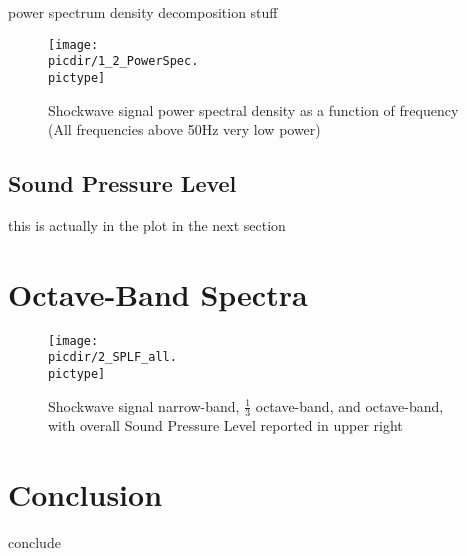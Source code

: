 \documentclass[twocolumn,10pt]{asme2ej}
\begin{document}
power spectrum density decomposition stuff

\begin{figure}[htb]
\begin{center}
\texttt{[image: \\picdir/1\_2\_PowerSpec.\\pictype]}
\caption{Shockwave signal power spectral density as a function of frequency (All frequencies above 50Hz very low power)}
\label{pic_spec}
\end{center}
\end{figure}

\subsection{Sound Pressure Level}

this is actually in the plot in the next section


\section{Octave-Band Spectra} \label{sect_oct}

\begin{figure}[htb]
\begin{center}
\texttt{[image: \\picdir/2\_SPLF\_all.\\pictype]}
\caption{Shockwave signal narrow-band, $\frac{1}{3}$ octave-band, and octave-band, with overall Sound Pressure Level reported in upper right}
\label{pic_oct}
\end{center}
\end{figure}




\section{Conclusion}

conclude

\end{document}
